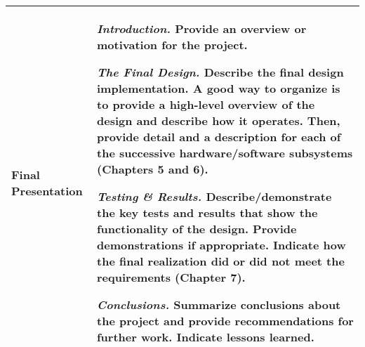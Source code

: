 \begin{table}
\begin{tabular}{|m{2cm}|m{13cm}|}
Final Presentation & \emph{Introduction.} Provide an overview or
motivation for the project.

\emph{The Final Design.} Describe the final design implementation. A
good way to organize is to provide a high-level overview of the design
and describe how it operates. Then, provide detail and a description for
each of the successive hardware/software subsystems (Chapters 5 and 6).

\emph{Testing \& Results.} Describe/demonstrate the key tests and
results that show the functionality of the design. Provide
demonstrations if appropriate. Indicate how the final realization did or
did not meet the requirements (Chapter 7).

\emph{Conclusions.} Summarize conclusions about the project and provide
recommendations for further work. Indicate lessons learned. \\ \hline
\end{tabular}
\end{table}



